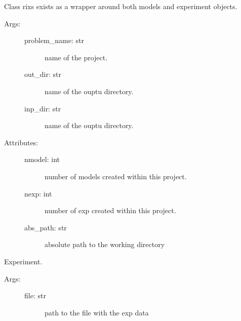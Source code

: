 \documentclass[letterpaper,10pt,english]{sphinxmanual}
\begin{document}
\begin{fulllineitems}
\label{\detokenize{modules/main:phlab.rixs}}
Class rixs exists as a wrapper around    both models and experiment objects.
\begin{description}
\item[{Args:}] \leavevmode\begin{description}
\item[{problem\_name:  str}] \leavevmode
name of the project.

\item[{out\_dir: str}] \leavevmode
name of the ouptu directory.

\item[{inp\_dir: str}] \leavevmode
name of the ouptu directory.

\end{description}

\item[{Attributes:}] \leavevmode\begin{description}
\item[{nmodel: int}] \leavevmode
number of models created within this project.

\item[{nexp: int}] \leavevmode
number of exp created within this project.

\item[{abs\_path: str}] \leavevmode
absolute path to the working directory

\end{description}

\end{description}

\begin{fulllineitems}
\label{\detokenize{modules/main:phlab.rixs.experiment}}
Experiment.
\begin{description}
\item[{Args:}] \leavevmode\begin{description}
\item[{file: str}] \leavevmode
path to the file with the exp data


\end{description}
\end{description}
\end{fulllineitems}
\end{fulllineitems}
\end{document}
